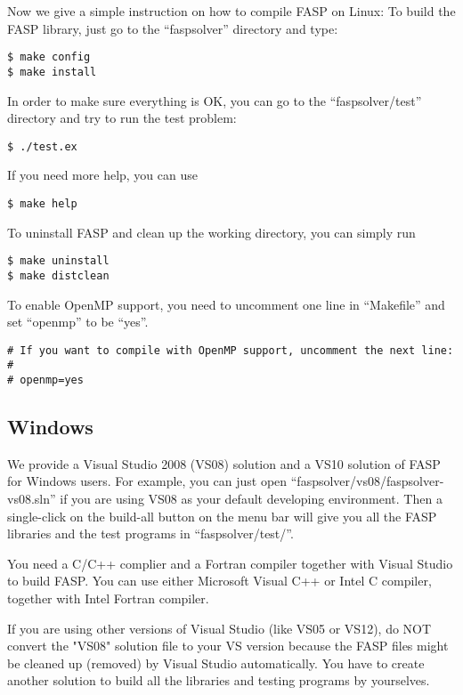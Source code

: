 \documentclass[11pt]{memoir}
\begin{document}
Now we give a simple instruction on how to compile FASP on Linux: To build the FASP library, just go to the ``faspsolver'' directory and type:
%
\begin{lstlisting}[numbers=none]
$ make config
$ make install
\end{lstlisting}
%
In order to make sure everything is OK, you can go to the ``faspsolver/test'' directory and try to run the test problem:
%
\begin{lstlisting}[numbers=none]
$ ./test.ex
\end{lstlisting}
%
If you need more help, you can use
%
\begin{lstlisting}[numbers=none]
$ make help
\end{lstlisting}
%
To uninstall FASP and clean up the working directory, you can simply run
%
\begin{lstlisting}[numbers=none]
$ make uninstall
$ make distclean
\end{lstlisting}
%
To enable OpenMP support, you need to uncomment one line in ``Makefile'' and set ``openmp'' to be ``yes''.
\begin{lstlisting}[numbers=none]
# If you want to compile with OpenMP support, uncomment the next line:
#
# openmp=yes
\end{lstlisting}


\subsection{Windows}

We provide a Visual Studio 2008 (VS08) solution and a VS10 solution of FASP for Windows users. For example, you can just open ``faspsolver/vs08/faspsolver-vs08.sln'' if you are using VS08 as your default developing environment. Then a single-click on the build-all button on the menu bar will give you all the FASP libraries and the test programs in ``faspsolver/test/''.

\begin{snugshade}\noindent
You need a C/C++ complier and a Fortran compiler together with Visual Studio to build FASP. You can use either Microsoft Visual C++ or Intel C compiler, together with Intel Fortran compiler.
\end{snugshade}

\begin{snugshade}\noindent
If you are using other versions of Visual Studio (like VS05 or VS12), do NOT convert the "VS08" solution file to your VS version because the FASP files might be cleaned up (removed) by Visual Studio automatically. You have to create another solution to build all the libraries and testing programs by yourselves.
\end{snugshade}
\end{document}
